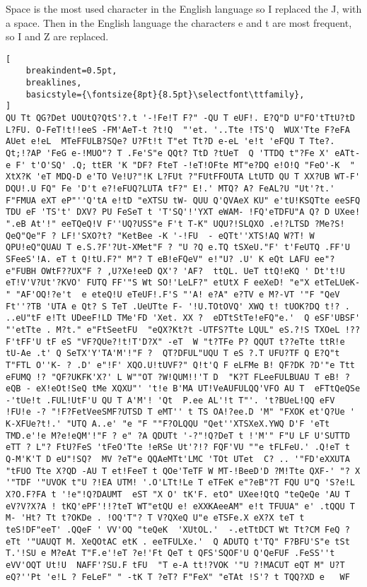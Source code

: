 \documentclass{uva-inf-bachelor-thesis}
\begin{document}
Space is the most used character in the English language so I replaced the J,
with a space. Then in the English language the characters e and t are most
frequent, so I and Z are replaced.

\begin{lstlisting}[
    breakindent=0.5pt,
    breaklines,
    basicstyle={\fontsize{8pt}{8.5pt}\selectfont\ttfamily},
]
QU Tt QG?Det UOUtQ?QtS'?.t '-!Fe!T F?" -QU T eUF!. E?Q"D U"FO'tTtU?tD  L?FU. O-FeT!t!!eeS -FM'AeT-t ?t!Q  "'et. '..Tte !TS'Q  WUX'Tte F?eFA AUet e!eL  MTeFFULB?SQe? U?Ft!t T"et Tt?D e-eL 'e!t 'eFQU T Tte?. Qt;!?AP 'FeG e-!MUO"? T .Fe'S"e QQt? TtD ?tUeT  Q 'TTDQ t"?Fe X' eATt-e F' t'O'SQ' .Q; ttER 'K "DF? FteT -!eT!OFte MT"e?DQ e!O!Q "FeO'-K  " XtX?K 'eT MDQ-D e'TO Ve!U?"!K L?FUt ?"FUtFFOUTA LtUTD QU T XX?UB WT-F' DQU!.U FQ" Fe 'D't e?!eFUQ?LUTA tF?" E!.' MTQ? A? FeAL?U "Ut'?t.'  F"FMUA eXT eP"''Q'tA e!tD "eXTSU tW- QUU Q'QVAeX KU" e'tU!KSQTte eeSFQ TDU eF 'TS't' DXV? PU FeSeT t 'T'SQ'!'YXT eWAM- !FQ'eTDFU"A Q? D UXee! ".eB At'!" eeTQeQ!V F''UQ?USS"e F't T-K" UQU?!SLQXO .e!?LTSD ?Me?S! QeQ"Qe"F ? LF!'SXO?t? "KetBee -K '-!FU  - eQTt''XTS!AQ W?T! W QPU!eQ"QUAU T e.S.?F'?Ut-XMet"F ? "U ?Q e.TQ tSXeU."F' t'FeUTQ .FF'U SFeeS'!A. eT t Q!tU.F?" M"? T eB!eFQeV" e!"U? .U' K eQt LAFU ee"?e"FUBH OWtF??UX"F ? ,U?Xe!eeD QX'? 'AF?  ttQL. UeT ttQ!eKQ ' Dt't!U eT!V'V?Ut'?KVO' FUTQ FF'"S Wt SO!'LeLF?" etUtX F eeXeD! "e"X etTeLUeK- " "AF'OQ!?e't  e eteQ!U eTeUF!.F'S "'A! e?A" e?TV e M?-VT '"F "QeV Ft''?TB 'UTA e Qt? S TeT .UeUTte F- '!U.TOtOVQ' XWQ t! tUOK?DQ t!? . ..eU"tF e!Tt UDeeF!LD TMe'FD 'Xet. XX ?  eDTtStTe!eFQ"e.'  Q eSF'UBSF' "'etTte . M?t." e"FtSeetFU  "eQX?Kt?t -UTFS?Tte LQUL" eS.?!S TXOeL !?? F'tFF'U tF eS "VF?QUe?!t!T'D?X" -eT  W "t?TFe P? QQUT t??eTte ttR!e tU-Ae .t' Q SeTX'Y'TA'M'!"F ?  QT?DFUL"UQU T eS ?.T UFU?TF Q E?Q"t T"FTL O''K- ? .D' e"!F' XQO.U!tUVF?" Q!t'Q F eLFMe B! QF?DK ?D'"e Ttt eFUMQ !? "QF?UKFK'X?' L W""OT ?W!QUM!!'T D  "K?T FLeeFULBUAU T eB! ?eQB - eX!eOt!SeQ tMe XQXU"' 't!e B'MA UT!VeAUFULQQ'VFO AU T  eFTtQeQSe -'tUe!t .FUL!UtF'U QU T A'M'! 'Qt  P.ee AL'!t T"'. 't?BUeL!QQ eFV !FU!e -? "!F?FetVeeSMF?UTSD T eMT'' t TS OA!?ee.D 'M" "FXOK et'Q?Ue ' K-XFUe?t!.' "UTQ A..e' "e "F ""F?OLQQU "Qet''XTSXeX.YWQ D'F 'eTt TMD.e'!e M?e!eQM'!"F ? e" ?A QDUTt '-?"!Q?DeT t !'M'" F"U LF U'SUTTD eTT ? L"? FtU?FeS 'tFeO'Tte !eRSe Ut'?!? FQF'VU ""e tFLFeU.' .Q!eT t Q-M'K'T D eU"!SQ?  MV ?eT"e QQAeMTt'LMC 'TOt UTet  C? .. '"FD'eXXUTA "tFUO Tte X?QD -AU T et!FeeT t QOe'TeTF W MT-!BeeD'D ?M!Tte QXF-' "? X  '"TDF '"UVOK t"U ?!EA UTM! '.O'LTt!Le T eTFeK e"?eB"?T FQU U"Q 'S?e!L X?O.F?FA t '!e"!Q?DAUMT  eST "X O' tK'F. etO" UXee!QtQ "teQeQe 'AU T eV?V?X?A ! tKQ'ePF'!!?teT WT"etQU e! eXXKAeeAM" e!t TFUUA" e' .tQQU T M- 'Ht? Tt t?OKDe . !OQ'T"? T V?QXeQ U"e eTSFe.X eX?X teT t teS!DF"eeT' .QQeF ' VV'OQ "teQeK  'XUtOL.'  -.etTtDCT Wt Tt?CM FeQ ?eTt '"UAUQT M. XeQOtAC etK . eeTFULXe.'  Q ADUTQ t'TQ" F?BFU'S"e tSt T.'!SU e M?eAt T"F.e'!eT ?e!'Ft QeT t QFS'SQOF'U Q'QeFUF .FeSS''t  eVV'OQT Ut!U  NAFF'?SU.F tFU  "T e-A tt!?VOK '"U ?!MACUT eQT M" U?T eQ?''Pt 'e!L ? FeLeF" " -tK T ?eT? F"FeX" "eTAt !S'? t TQQ?XD e   WF
\end{lstlisting}
\end{document}
